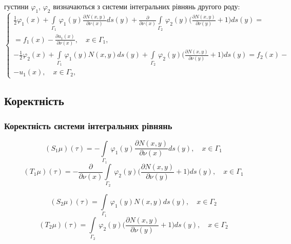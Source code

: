 \documentclass[10pt]{beamer}
\begin{document}
\begin{frame}
густини $\varphi_{1}$, $\varphi_{2}$ визначаються з системи інтегральних рівнянь другого роду:
\begin{equation}\label{13}
 \left\{
\begin{array}{c}
   \displaystyle
\frac{1}{2}\varphi_{1}(x) + \int\limits_{\Gamma_1} \, \varphi_1(y)\frac{\partial N(x,y)}{\partial\nu(x)}ds(y)+\frac{\partial }{\partial\nu(x)}\int\limits_{\Gamma_2} \, \varphi_2(y)\bigg(\frac{\partial N(x,y)}{\partial\nu(y)} + 1\bigg)ds(y) = \\=f_1(x) -\frac{\partial u_{1}(x)}{\partial\nu(x)}, \quad x\in \Gamma_1,\\

	\displaystyle
  -\frac{1}{2}\varphi_{2}(x) + \int\limits_{\Gamma_1} \, \varphi_1(y)N(x,y)ds(y)+\int\limits_{\Gamma_2} \, \varphi_2(y)\bigg(\frac{\partial N(x,y)}{\partial\nu(y)} + 1\bigg)ds(y)=f_2(x)- \\ -u_{1}(x), \quad x\in \Gamma_2,
 \end{array}
\right.
\end{equation}

\end{frame}

\subsection{Коректність}
\begin{frame}
\frametitle{Коректність системи інтегральних рівнянь}
\begin{equation*}
(S_{1}\mu)(\tau)=-\int\limits_{\Gamma_1} \, \varphi_1(y)\frac{\partial N(x,y)}{\partial\nu(x)}ds(y), \quad x\in \Gamma_1
\end{equation*}
\begin{equation*}
(T_{1}\mu)(\tau)=-\frac{\partial }{\partial\nu(x)}\int\limits_{\Gamma_2} \, \varphi_2(y)\bigg(\frac{\partial N(x,y)}{\partial\nu(y)} + 1\bigg)ds(y), \quad x\in \Gamma_1
\end{equation*}

\begin{equation*}
(S_{2}\mu)(\tau)=\int\limits_{\Gamma_1} \, \varphi_1(y)N(x,y)ds(y), \quad x\in \Gamma_2
\end{equation*}
\begin{equation*}
(T_{2}\mu)(\tau)=\int\limits_{\Gamma_2} \, \varphi_2(y)\bigg(\frac{\partial N(x,y)}{\partial\nu(y)} + 1\bigg)ds(y), \quad x\in \Gamma_2
\end{equation*}
\end{frame}
\end{document}
